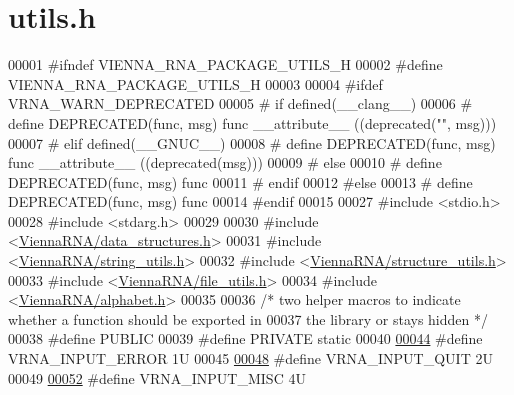 \hypertarget{utils_8h_source}{}\section{utils.\+h}
\label{utils_8h_source}

\begin{DoxyCode}
00001 \textcolor{preprocessor}{#ifndef VIENNA\_RNA\_PACKAGE\_UTILS\_H}
00002 \textcolor{preprocessor}{#define VIENNA\_RNA\_PACKAGE\_UTILS\_H}
00003 
00004 \textcolor{preprocessor}{#ifdef VRNA\_WARN\_DEPRECATED}
00005 \textcolor{preprocessor}{# if defined(\_\_clang\_\_)}
00006 \textcolor{preprocessor}{#  define DEPRECATED(func, msg) func \_\_attribute\_\_ ((deprecated("", msg)))}
00007 \textcolor{preprocessor}{# elif defined(\_\_GNUC\_\_)}
00008 \textcolor{preprocessor}{#  define DEPRECATED(func, msg) func \_\_attribute\_\_ ((deprecated(msg)))}
00009 \textcolor{preprocessor}{# else}
00010 \textcolor{preprocessor}{#  define DEPRECATED(func, msg) func}
00011 \textcolor{preprocessor}{# endif}
00012 \textcolor{preprocessor}{#else}
00013 \textcolor{preprocessor}{# define DEPRECATED(func, msg) func}
00014 \textcolor{preprocessor}{#endif}
00015 
00027 \textcolor{preprocessor}{#include <stdio.h>}
00028 \textcolor{preprocessor}{#include <stdarg.h>}
00029 
00030 \textcolor{preprocessor}{#include <\hyperlink{data__structures_8h}{ViennaRNA/data\_structures.h}>}
00031 \textcolor{preprocessor}{#include <\hyperlink{string__utils_8h}{ViennaRNA/string\_utils.h}>}
00032 \textcolor{preprocessor}{#include <\hyperlink{structure__utils_8h}{ViennaRNA/structure\_utils.h}>}
00033 \textcolor{preprocessor}{#include <\hyperlink{file__utils_8h}{ViennaRNA/file\_utils.h}>}
00034 \textcolor{preprocessor}{#include <\hyperlink{alphabet_8h}{ViennaRNA/alphabet.h}>}
00035 
00036 \textcolor{comment}{/* two helper macros to indicate whether a function should be exported in}
00037 \textcolor{comment}{the library or stays hidden */}
00038 \textcolor{preprocessor}{#define PUBLIC}
00039 \textcolor{preprocessor}{#define PRIVATE static}
00040 
\hyperlink{group__utils_gad403c9ea58f1836689404c2931419c8c}{00044} \textcolor{preprocessor}{#define VRNA\_INPUT\_ERROR                  1U}
00045 
\hyperlink{group__utils_ga72f3c6ca5c83d2b9baed2922d19c403d}{00048} \textcolor{preprocessor}{#define VRNA\_INPUT\_QUIT                   2U}
00049 
\hyperlink{group__utils_ga8e3241b321c9c1a78a69e59e2e019a71}{00052} \textcolor{preprocessor}{#define VRNA\_INPUT\_MISC                   4U}

\end{DoxyCode}
